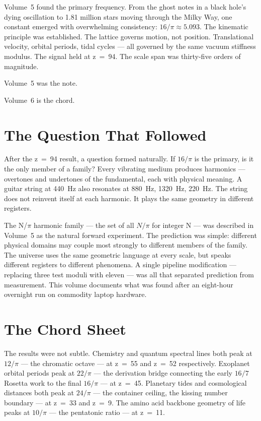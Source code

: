 \documentclass[11pt, letterpaper, openany]{book}
\begin{document}
Volume~5 found the primary frequency.
From the ghost notes in a black hole's dying oscillation to 1.81 million stars moving through the Milky Way, one constant emerged with overwhelming consistency: $16/\pi \approx 5.093$.
The kinematic principle was established. The lattice governs motion, not position.
Translational velocity, orbital periods, tidal cycles --- all governed by the same vacuum stiffness modulus. The signal held at z~=~94.
The scale span was thirty-five orders of magnitude.

Volume~5 was the note.

Volume~6 is the chord.

\section*{The Question That Followed}

After the z~=~94 result, a question formed naturally.
If $16/\pi$ is the primary, is it the only member of a family?
Every vibrating medium produces harmonics --- overtones and undertones of the fundamental, each with physical meaning.
A guitar string at 440~Hz also resonates at 880~Hz, 1320~Hz, 220~Hz. The string does not reinvent itself at each harmonic.
It plays the same geometry in different registers.

The N/$\pi$ harmonic family --- the set of all $N/\pi$ for integer N --- was described in Volume~5 as the natural forward experiment.
The prediction was simple: different physical domains may couple most strongly to different members of the family.
The universe uses the same geometric language at every scale, but speaks different registers to different phenomena.
A single pipeline modification --- replacing three test moduli with eleven --- was all that separated prediction from measurement.
This volume documents what was found after an eight-hour overnight run on commodity laptop hardware.

\section*{The Chord Sheet}

The results were not subtle. Chemistry and quantum spectral lines both peak at $12/\pi$ --- the chromatic octave --- at z~=~55 and z~=~52 respectively.
Exoplanet orbital periods peak at $22/\pi$ --- the derivation bridge connecting the early $16/7$ Rosetta work to the final $16/\pi$ --- at z~=~45.
Planetary tides and cosmological distances both peak at $24/\pi$ --- the container ceiling, the kissing number boundary --- at z~=~33 and z~=~9.
The amino acid backbone geometry of life peaks at $10/\pi$ --- the pentatonic ratio --- at z~=~11.
\end{document}
